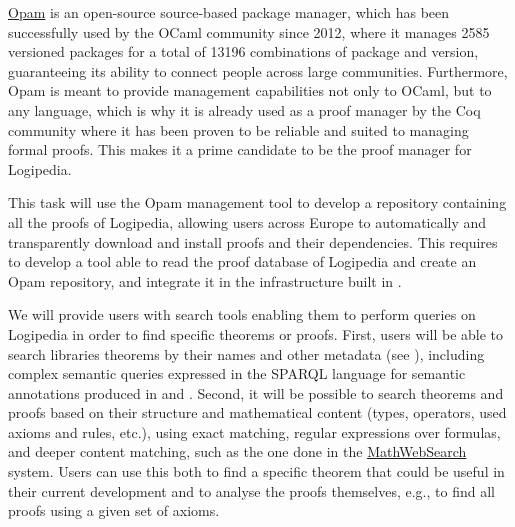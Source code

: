 \begin{workpackage}[id=access,type=RTD,wphases=1-48,
  short=Access,%
  title={Access},
  activity=tna,
  lead=Inr,InrRM=54,OcaRM=6]
\begin{tasklist}
\begin{task}[id=opam,
      title=Giving access to the infrastructure in proof systems,
      shorttitle=Syst.,
      lead=Oca,OcaRM=6,wphases=7-12]
    \href{https://opam.ocaml.org/}{Opam} is an open-source source-based package manager,
    which has been successfully used by the OCaml community since
    2012, where it manages 2585 versioned packages for a total of
    13196 combinations of package and version, guaranteeing its
    ability to connect people across large communities. Furthermore,
    Opam is meant to provide management capabilities not only to
    OCaml, but to any language, which is why it is already used as a
    proof manager by the Coq community where it has been proven to be
    reliable and suited to managing formal proofs. This makes it a
    prime candidate to be the proof manager for Logipedia.

    This task will use the Opam management tool to develop a
    repository containing all the proofs of Logipedia, allowing users
    across Europe to automatically and transparently download and
    install proofs and their dependencies. This
    requires to develop a tool able to read the proof
    database of Logipedia and create an Opam repository,
    and integrate it in the infrastructure built in .
  \end{task}

  \begin{task}[id=search,
      title=Providing search tools,
      shorttitle=Search,
      lead=Inr,InrRM=18,wphases=19-36]
    We will provide users with search tools enabling them to perform
    queries on Logipedia in order to find specific theorems or proofs.
    First, users will be able to search libraries theorems by their
    names and other metadata (see ),
    including complex semantic queries expressed in the SPARQL
    language for semantic annotations produced in
     and
    . Second, it will be possible to
    search theorems and proofs based on their structure and
    mathematical content (types, operators, used axioms and rules,
    etc.), using exact matching, regular expressions over formulas, and
    deeper content matching, such as the one done in the
    \hyperlink{https://kwarc.info/systems/mws/}{MathWebSearch}
    system. Users can use this both to find a specific theorem that
    could be useful in their current development and to analyse the
    proofs themselves, e.g., to find all proofs using a given set of
    axioms. 
  \end{task}


\end{tasklist}
\end{workpackage}

